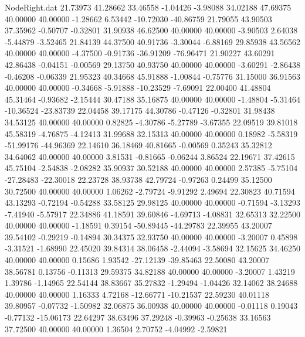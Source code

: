 \begin{filecontents}{NodeRight.dat}
  21.73973   41.28662   33.46558    -1.04426   -3.98088   34.02188   47.69375   40.00000   40.00000   -1.28662    6.53442  -10.72030  -40.86759
  21.79055   43.90503   37.35962    -0.50707   -0.32801   31.90938   46.62500   40.00000   40.00000   -3.90503    2.64038   -5.44879   -3.52465
  21.84139   44.37500   40.91736    -3.30044   -6.88169   29.85938   43.56562   40.00000   40.00000   -4.37500   -0.91736  -36.91209  -76.96471
  21.90227   43.60291   42.86438    -0.04151   -0.00569   29.13750   40.93750   40.00000   40.00000   -3.60291   -2.86438   -0.46208   -0.06339
  21.95323   40.34668   45.91888    -1.00844   -0.75776   31.15000   36.91563   40.00000   40.00000   -0.34668   -5.91888  -10.23529   -7.69091
  22.00400   41.48804   45.31464    -0.93682   -2.15444   30.47188   35.16875   40.00000   40.00000   -1.48804   -5.31464  -10.36524  -23.83739
  22.04458   39.17175   44.30786    -0.47126   -0.32801   31.98438   34.53125   40.00000   40.00000    0.82825   -4.30786   -5.27789   -3.67355
  22.09519   39.81018   45.58319    -4.76875   -4.12413   31.99688   32.15313   40.00000   40.00000    0.18982   -5.58319  -51.99176  -44.96369
  22.14610   36.18469   40.81665    -0.00569    0.35243   35.32812   34.64062   40.00000   40.00000    3.81531   -0.81665   -0.06244    3.86524
  22.19671   37.42615   45.75104    -2.54838   -2.08282   35.90937   30.52188   40.00000   40.00000    2.57385   -5.75104  -27.28483  -22.30018
  22.23728   38.93738   42.79724    -0.97263    0.24499   35.12500   30.72500   40.00000   40.00000    1.06262   -2.79724   -9.91292    2.49694
  22.30823   40.71594   43.13293    -0.72194   -0.54288   33.58125   29.98125   40.00000   40.00000   -0.71594   -3.13293   -7.41940   -5.57917
  22.34886   41.18591   39.60846    -4.69713   -4.08831   32.65313   32.22500   40.00000   40.00000   -1.18591    0.39154  -50.89445  -44.29783
  22.39955   43.20007   39.54102    -0.29219   -0.14894   30.34375   32.93750   40.00000   40.00000   -3.20007    0.45898   -3.31521   -1.68990
  22.45020   39.84314   38.06458    -2.44094   -3.58694   32.15625   34.46250   40.00000   40.00000    0.15686    1.93542  -27.12139  -39.85463
  22.50080   43.20007   38.56781     0.13756   -0.11313   29.59375   34.82188   40.00000   40.00000   -3.20007    1.43219    1.39786   -1.14965
  22.54144   38.83667   35.27832    -1.29494   -1.04426   32.14062   38.24688   40.00000   40.00000    1.16333    4.72168  -12.66771  -10.21537
  22.59230   40.01118   39.80957    -0.07732   -1.50982   32.06875   36.00938   40.00000   40.00000   -0.01118    0.19043   -0.77132  -15.06173
  22.64297   38.63496   37.29248    -0.39963   -0.25638   33.16563   37.72500   40.00000   40.00000    1.36504    2.70752   -4.04992   -2.59821

\end{filecontents}
